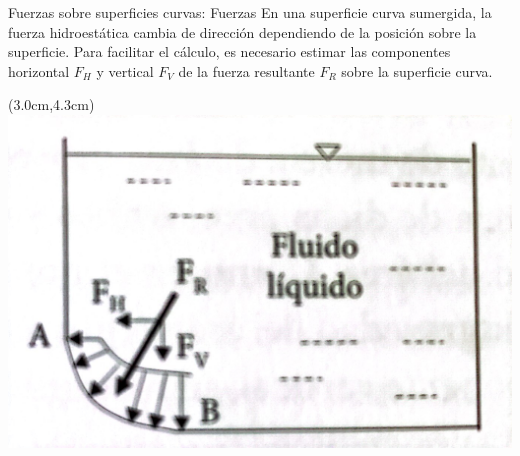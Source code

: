 \documentclass [xcolor=svgnames, t] {beamer}
\begin{document}
\begin{frame}{Fuerzas sobre superficies curvas: Fuerzas}
En una superficie curva sumergida, la fuerza hidroest\'atica cambia de direcci\'on dependiendo de la posici\'on sobre la superficie. Para facilitar el c\'alculo, es necesario estimar las componentes horizontal $F_H$ y vertical $F_V$ de  la fuerza resultante $F_R$ sobre la superficie curva. 
\begin{textblock*}{6.5cm}(3.0cm,4.3cm) %
\includegraphics[width=\textwidth]{curb2}
\end{textblock*}
\end{frame}
\end{document}
